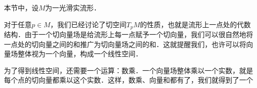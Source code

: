 

本节中，设$M$为一光滑实流形．

对于任意$p\in M$，我们已经讨论了切空间$T_pM$的性质，也就是流形上一点处的代数结构．由于一个切向量场是给流形上每一点赋予一个切向量，我们可以很自然地将一点处的切向量之间的和推广为切向量场之间的和．这就提醒我们，也许可以将向量场整体视为一个向量，构成一个线性空间．

为了得到线性空间，还需要一个运算：数乘．一个向量场整体乘以一个实数，就是每个点的切向量都乘以这个实数．这样，数乘、向量和都有了，我们就得到了一个








